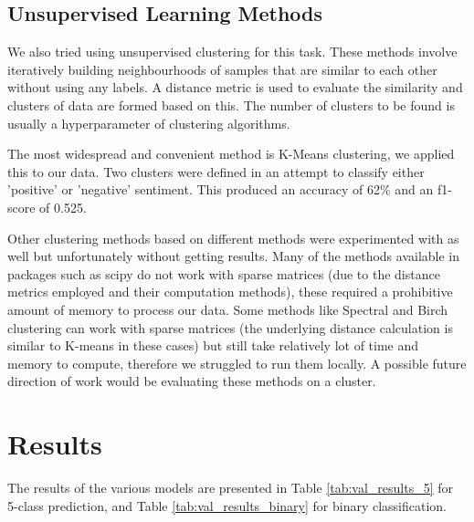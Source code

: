\documentclass{article}
\begin{document}
\subsection{Unsupervised Learning Methods}
We also tried using unsupervised clustering for this task. These methods involve iteratively building neighbourhoods of samples that are similar to each other without using any labels. A distance metric is used to evaluate the similarity and clusters of data are formed based on this. The number of clusters to be found is usually a hyperparameter of clustering algorithms.

The most widespread and convenient method is K-Means clustering, we applied this to our data. Two clusters were  defined in an attempt to classify either 'positive' or 'negative' sentiment. This produced an accuracy of 62\% and an f1-score of 0.525. 

Other clustering methods based on different methods were experimented with as well but unfortunately without getting results. Many of the methods available in packages such as scipy do not work with sparse matrices (due to the distance metrics employed and their computation methods), these required a prohibitive amount of memory to process our data. Some methods like Spectral and Birch clustering can work with sparse matrices (the underlying distance calculation is similar to K-means in these cases) but still take relatively lot of time and memory to compute, therefore we struggled to run them locally. A possible future direction of work would be evaluating these methods on a cluster. 

\section{Results}
\label{results}

The results of the various models are presented in Table \ref{tab:val_results_5} for 5-class prediction, and Table \ref{tab:val_results_binary} for binary classification.
\end{document}

